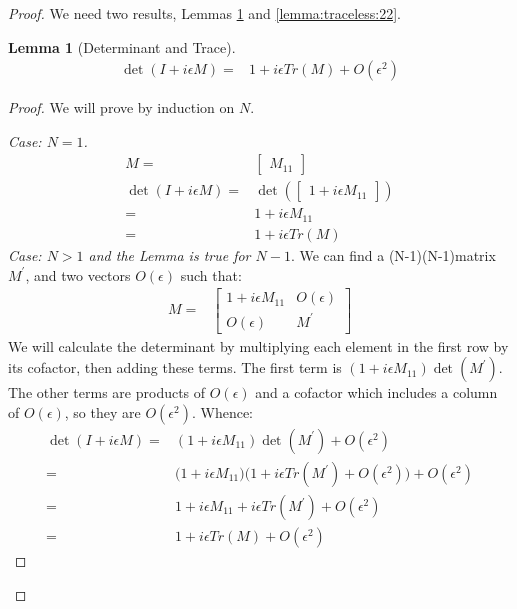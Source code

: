 \documentclass[]{article}
\newtheorem{lemma}[thm]{Lemma}
\begin{document}
\begin{proof}
	We need two results, Lemmas \ref{lemma:det:Tr} and \ref{lemma:traceless:22}.
	\begin{lemma}[Determinant and Trace]\label{lemma:det:Tr}
		\begin{align*}
		\det( I + i \epsilon M) =& 1 + i\epsilon Tr(M) + O(\epsilon^2)
		\end{align*}
	\end{lemma}
	\begin{proof}
		We will prove by induction on $N$.
		
		
		\emph{Case: $N=1$.}
		\begin{align*}
			M =&\begin{bmatrix}
				M_{11}
			\end{bmatrix}\\
			\det( I + i \epsilon M) =& \det(\begin{bmatrix}
				1 + i \epsilon M_{11}
			\end{bmatrix}
			)\\
			=& 1 + i \epsilon M_{11}\\
			=&  1 + i\epsilon Tr(M)
		\end{align*}
		\emph{Case: $N>1$ and the Lemma is true for $N-1$}. We can find a (N-1)\times(N-1)matrix $M^{\prime}$, and two vectors $O(\epsilon)$ such that:
		\begin{align*}
			M =& \begin{bmatrix}
				1 + i \epsilon M_{11}&O(\epsilon)\\
				O(\epsilon)&M^{\prime} 
			\end{bmatrix}
		\end{align*}
		We will calculate the determinant by multiplying each element in the first row by its cofactor, then adding these terms. The first term is $(1 + i \epsilon M_{11})\det(M^{\prime})$. The other terms are products of $O(\epsilon)$ and a cofactor which includes a column of $O(\epsilon)$, so they are $O(\epsilon^2)$. Whence:
		\begin{align*}
			\det( I + i \epsilon M) =& 	(1 + i \epsilon M_{11}) \det(M^{\prime})+ O(\epsilon^2)\\ 
			=& \big(1 + i \epsilon M_{11}\big)\big(1 + i\epsilon Tr(M^{\prime}) + O(\epsilon^2)\big) + O(\epsilon^2)\\
			=& 1 + i \epsilon M_{11} + i\epsilon Tr(M^{\prime}) + O(\epsilon^2)\\
			=&1 + i\epsilon Tr(M) + O(\epsilon^2)
		\end{align*}
	\end{proof}
	

\end{proof}
\end{document}
